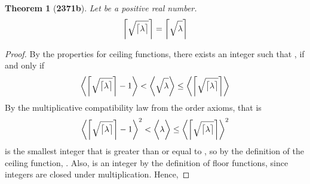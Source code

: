 \documentclass[preview]{standalone}
\newtheorem*{theorem*}{Theorem}
\begin{document}
\begin{theorem*}[\textbf{2371b}]
    Let \bm{$\lambda$} be a positive real number.
    \begin{equation*}
        \relax{
            \bigg \lceil 
                \sqrt{ \strut \big \lceil \lambda \big \rceil }
            \bigg \rceil 
                = 
            \bigg \lceil \sqrt{ \strut \lambda } \bigg \rceil
        }
    \end{equation*}
\end{theorem*}

\begin{proof}
    By the properties for ceiling functions,
    there exists an integer
    \bm{$\big \lceil \sqrt{ \lceil \lambda \rceil} \big \rceil$}
    such that
    \bm{$
        \big \lceil \sqrt{ \lambda } \big \rceil
            =
        \big \lceil \sqrt{ \lceil \lambda \rceil} \big \rceil$
    },
    if and only if
    \begin{equation*}
        \bigg \langle
            \bigg \lceil
                \sqrt{ \strut \big \lceil \lambda \big \rceil }
            \bigg \rceil
                -
            1
        \bigg \rangle
            <
        \bigg \langle
            \sqrt{ \strut \lambda }
        \bigg \rangle
            \leq
        \bigg \langle
            \bigg \lceil
                \sqrt{ \strut \big \lceil \lambda \big \rceil }
            \bigg \rceil
        \bigg \rangle
    \end{equation*}
    By the multiplicative compatibility law from the order axioms, that is
    \begin{equation*}
        \bigg \langle
            \bigg \lceil
                \sqrt{ \strut \big \lceil \lambda \big \rceil }
            \bigg \rceil
                -
            1
        \bigg \rangle
            ^2
            <
        \bigg \langle
            \lambda
        \bigg \rangle
            \leq
        \bigg \langle
            \bigg \lceil
                \sqrt{ \strut \big \lceil \lambda \big \rceil }
            \bigg \rceil
        \bigg \rangle
            ^2
    \end{equation*}
    \bm{$\big \lceil \lambda \big \rceil$} is the smallest integer that is greater than or equal to \bm{$\lambda$},
    so by the definition of the ceiling function, 
    \bm{$\lambda \leq \big \lceil \lambda \big \rceil$}.
    Also, 
    is an integer by the definition of floor functions,
    since integers are closed under multiplication.
    Hence,

\end{proof}
\end{document}
